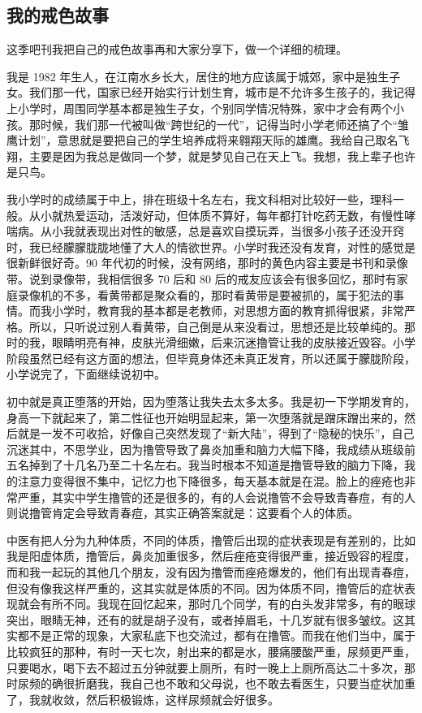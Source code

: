 \subsection{我的戒色故事}

这季吧刊我把自己的戒色故事再和大家分享下，做一个详细的梳理。

我是 1982 年生人，在江南水乡长大，居住的地方应该属于城郊，家中是独生子女。我们那一代，国家已经开始实行计划生育，城市是不允许多生孩子的，我记得上小学时，周围同学基本都是独生子女，个别同学情况特殊，家中才会有两个小孩。那时候，我们那一代被叫做“跨世纪的一代”，记得当时小学老师还搞了个“雏鹰计划”，意思就是要把自己的学生培养成将来翱翔天际的雄鹰。我给自己取名飞翔，主要是因为我总是做同一个梦，就是梦见自己在天上飞。我想，我上辈子也许是只鸟。

我小学时的成绩属于中上，排在班级十名左右，我文科相对比较好一些，理科一般。从小就热爱运动，活泼好动，但体质不算好，每年都打针吃药无数，有慢性哮喘病。从小我就表现出对性的敏感，总是喜欢自摸玩弄，当很多小孩子还没开窍时，我已经朦朦胧胧地懂了大人的情欲世界。小学时我还没有发育，对性的感觉是很新鲜很好奇。90 年代初的时候，没有网络，那时的黄色内容主要是书刊和录像带。说到录像带，我相信很多 70 后和 80 后的戒友应该会有很多回忆，那时有家庭录像机的不多，看黄带都是聚众看的，那时看黄带是要被抓的，属于犯法的事情。而我小学时，教育我的基本都是老教师，对思想方面的教育抓得很紧，非常严格。所以，只听说过别人看黄带，自己倒是从来没看过，思想还是比较单纯的。那时的我，眼睛明亮有神，皮肤光滑细嫩，后来沉迷撸管让我的皮肤接近毁容。小学阶段虽然已经有这方面的想法，但毕竟身体还未真正发育，所以还属于朦胧阶段，小学说完了，下面继续说初中。

初中就是真正堕落的开始，因为堕落让我失去太多太多。我是初一下学期发育的，身高一下就起来了，第二性征也开始明显起来，第一次堕落就是蹭床蹭出来的，然后就是一发不可收拾，好像自己突然发现了“新大陆”，得到了“隐秘的快乐”，自己沉迷其中，不思学业，因为撸管导致了鼻炎加重和脑力大幅下降，我成绩从班级前五名掉到了十几名乃至二十名左右。我当时根本不知道是撸管导致的脑力下降，我的注意力变得很不集中，记忆力也下降很多，每天基本就是在混。脸上的痤疮也非常严重，其实中学生撸管的还是很多的，有的人会说撸管不会导致青春痘，有的人则说撸管肯定会导致青春痘，其实正确答案就是：这要看个人的体质。

中医有把人分为九种体质，不同的体质，撸管后出现的症状表现是有差别的，比如我是阳虚体质，撸管后，鼻炎加重很多，然后痤疮变得很严重，接近毁容的程度，而和我一起玩的其他几个朋友，没有因为撸管而痤疮爆发的，他们有出现青春痘，但没有像我这样严重的，这其实就是体质的不同。因为体质不同，撸管后的症状表现就会有所不同。我现在回忆起来，那时几个同学，有的白头发非常多，有的眼球突出，眼睛无神，还有的就是胡子没有，或者掉眉毛，十几岁就有很多皱纹。这其实都不是正常的现象，大家私底下也交流过，都有在撸管。而我在他们当中，属于比较疯狂的那种，有时一天七次，射出来的都是水，腰痛腰酸严重，尿频更严重，只要喝水，喝下去不超过五分钟就要上厕所，有时一晚上上厕所高达二十多次，那时尿频的确很折磨我，我自己也不敢和父母说，也不敢去看医生，只要当症状加重了，我就收敛，然后积极锻炼，这样尿频就会好很多。

